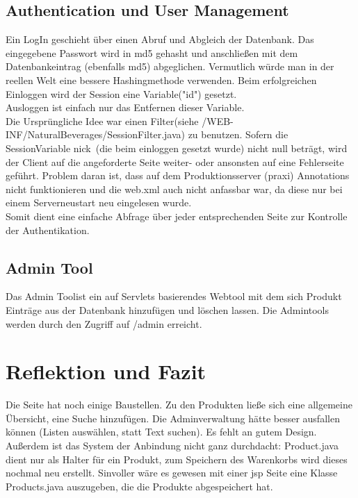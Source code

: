 \documentclass[a4paper, 11pt]{article}
\begin{document}
\subsection{Authentication und User Management}
Ein LogIn geschieht über einen Abruf und Abgleich der Datenbank. Das eingegebene Passwort wird in md5 gehasht und anschließen mit dem Datenbankeintrag (ebenfalls md5) abgeglichen.
Vermutlich würde man in der reellen Welt eine bessere Hashingmethode verwenden. Beim erfolgreichen Einloggen wird der Session eine Variable("id") gesetzt. \\
Ausloggen ist einfach nur das Entfernen dieser Variable.\\
Die Ursprüngliche Idee war einen Filter(siehe /WEB-INF/NaturalBeverages/SessionFilter.java) zu benutzen. Sofern die SessionVariable \grqq nick\grqq \ (die beim einloggen gesetzt wurde) nicht null beträgt, wird der Client auf die angeforderte Seite weiter- oder ansonsten auf eine Fehlerseite geführt. Problem daran ist, dass auf dem Produktionsserver (praxi) Annotations nicht funktionieren und die web.xml auch nicht anfassbar war, da diese nur bei einem Serverneustart neu eingelesen wurde. \\
Somit dient eine einfache Abfrage über jeder entsprechenden Seite zur Kontrolle der Authentikation.  

\subsection{Admin Tool}
Das \grqq Admin Tool\grqq  ist ein auf Servlets basierendes Webtool mit dem sich Produkt Einträge aus der Datenbank hinzufügen und löschen lassen. Die Admintools werden durch den Zugriff auf /admin erreicht. 

\section{Reflektion und Fazit}
Die Seite hat noch einige Baustellen. Zu den Produkten ließe sich eine allgemeine Übersicht, eine Suche hinzufügen. Die Adminverwaltung hätte besser ausfallen können (Listen auswählen, statt Text suchen). Es fehlt an gutem Design.\\

Außerdem ist das System der Anbindung nicht ganz durchdacht: Product.java dient nur als Halter für ein Produkt, zum Speichern des Warenkorbs wird dieses nochmal neu erstellt. Sinvoller wäre es gewesen mit einer jsp Seite eine Klasse Products.java auszugeben, die die Produkte abgespeichert hat. \\
\end{document}
